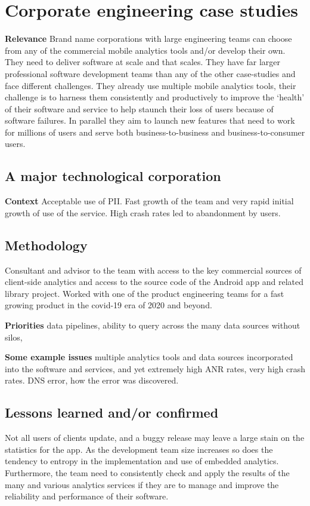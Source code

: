 \section{Corporate engineering case studies}

\textbf{Relevance}
Brand name corporations with large engineering teams can choose from any of the commercial mobile analytics tools and/or develop their own. They need to deliver software at scale and that scales. They have far larger professional software development teams than any of the other case-studies and face different challenges. They already use multiple mobile analytics tools, their challenge is to harness them consistently and productively to improve the `health' of their software and service to help staunch their loss of users because of software failures. In parallel they aim to launch new features that need to work for millions of users and serve both business-to-business and business-to-consumer users.


\subsection{A major technological corporation}
\textbf{Context} Acceptable use of PII. Fast growth of the team and very rapid initial growth of use of the service. High crash rates led to abandonment by users. 



\subsection{Methodology}
Consultant and advisor to the team with access to the key commercial sources of client-side analytics and access to the source code of the Android app and related library project. Worked with one of the product engineering teams for a fast growing product in the covid-19 era of 2020 and beyond.

\textbf{Priorities} data pipelines, ability to query across the many data sources without silos, 

\textbf{Some example issues} multiple analytics tools and data sources incorporated into the software and services, and yet extremely high ANR rates, very high crash rates. DNS error, how the error was discovered. 

\subsection{Lessons learned and/or confirmed}
Not all users of clients update, and a buggy release may leave a large stain on the statistics for the app. As the development team size increases so does the tendency to entropy in the implementation and use of embedded analytics. Furthermore, the team need to consistently check and apply the results of the many and various analytics services if they are to manage and improve the reliability and performance of their software.

